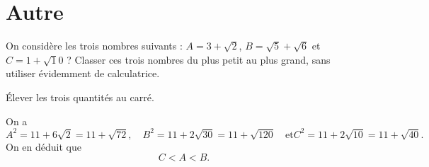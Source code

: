 \begin{exo}
\begin{center}
\begin{tikzpicture}
\end{tikzpicture}
\end{center}
\begin{hint}
\end{hint}
\begin{sol}
\end{sol}
\end{exo}





\begin{exo}
\begin{center}
\begin{tikzpicture}
\end{tikzpicture}
\end{center}
\begin{hint}
\end{hint}
\begin{sol}
\end{sol}
\end{exo}





\begin{exo}
\begin{center}
\begin{tikzpicture}
\end{tikzpicture}
\end{center}
\begin{hint}
\end{hint}
\begin{sol}
\end{sol}
\end{exo}


\section{Autre}



\begin{exo}

On considère les trois nombres suivants : $A=3+\sqrt 2$, $B=\sqrt 5 +\sqrt 6$ et $C=1+\sqrt 10$ ?
Classer ces trois nombres du plus petit au plus grand, sans utiliser évidemment de calculatrice.
\begin{hint}
Élever les trois quantités au carré.
\end{hint}
\begin{sol}
On a 
\[
A^2 = 11+6\sqrt 2 = 11+\sqrt{72},\quad
B^2 = 11+2\sqrt{30}=11+\sqrt{120} \quad\text{et}
C^2 = 11+2\sqrt{10}=11+\sqrt{40}.\]
On en déduit que 
\[ C< A < B.\]
\end{sol}
\end{exo}





\indications
\correction



